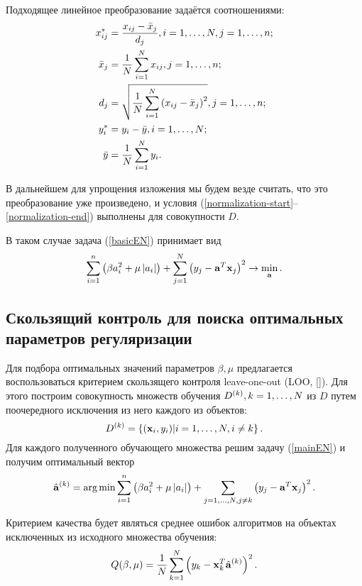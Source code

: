 Подходящее линейное преобразование задаётся соотношениями:
\begin{align*}
	x^*_{ij} 	&= \frac{x_{ij} - \bar x_j}{d_j}, i=1, \ldots, N, j=1, \ldots, n;\\
	\bar x_j 	&= \frac1N\sum\limits_{i=1}^N x_{ij}, j=1, \ldots, n;\\
	d_j 		&= \sqrt{\frac1N\sum\limits_{i=1}^N \left(x_{ij}-\bar x_j\right)^2}, j=1, \ldots, n;\\
	y^*_i 		&= y_i - \bar y, i=1, \ldots, N;\\
	\bar y 		&= \frac1N\sum\limits_{i=1}^N y_i. \\
\end{align*}

В дальнейшем для упрощения изложения мы будем везде считать, что это преобразование уже произведено, и условия (\ref{normalization-start}--\ref{normalization-end}) выполнены для совокупности $D.$

В таком случае задача (\ref{basicEN}) принимает вид
\begin{equation}
	\label{mainEN}
	\sum_{i=1}^n\left(\beta a_i^2 + \mu \left|a_i\right|\right) 
	+ \sum_{j=1}^N\left(y_j - \boldsymbol{\mathbf{a}}^T \boldsymbol{\mathbf{x}}_j\right)^2 
	\to \mathop{\mbox{min}}\limits_{\boldsymbol{\mathbf{a}}}.
\end{equation}

\subsection{Скользящий контроль для поиска оптимальных параметров регуляризации}
Для подбора оптимальных значений параметров $\beta, \mu$ предлагается воспользоваться критерием скользящего контроля leave-one-out (LOO, []).
Для этого построим совокупность множеств обучения $D^{(k)}, k=1, \ldots, N$ из $D$ путем поочередного исключения из него каждого из объектов: 
\begin{equation}
	D^{(k)}=\left\{(\boldsymbol{\mathbf{x}}_i, y_i) | i=1, \ldots, N, i\ne k\right\}.
\end{equation}
Для каждого полученного обучающего множества решим задачу (\ref{mainEN}) и получим оптимальный вектор 
\begin{equation*}
	\hat{\boldsymbol{\mathbf{a}}}^{(k)} 
	= \mathop{\mbox{arg\ \!min}}\limits \sum\limits_{i=1}^n\left(\beta a_i^2 + \mu \left|a_i\right|\right) 
	+ \sum\limits_{j=1, \ldots, N, j\ne k}\left(y_j - \boldsymbol{\mathbf{a}}^T \boldsymbol{\mathbf{x}}_j\right)^2.
\end{equation*}

Критерием качества будет являться среднее ошибок алгоритмов на объектах исключенных из исходного множества обучения:
\begin{equation}
	Q(\beta, \mu) = \frac1N\sum\limits_{k=1}^N \left(y_k - \boldsymbol{\mathbf{x}}_k^T\hat{\boldsymbol{\mathbf{a}}}^{(k)}\right)^2.
\end{equation}

